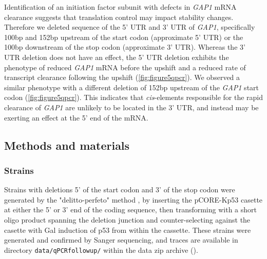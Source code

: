 Identification of an initiation factor subunit with defects in
\textit{GAP1} mRNA clearance suggests that translation control may
impact stability changes. Therefore we deleted sequence of 
the 5' UTR and 3' UTR of \textit{GAP1}, specifically 100bp and 152bp 
upstream of the start codon (approximate 5' UTR) or the
100bp downstream of the stop codon (approximate 3' UTR).
Whereas the 3' UTR deletion does not have an effect, the 5' UTR deletion
exhibits the phenotype of reduced \textit{GAP1} mRNA before the upshift
and a reduced rate of transcript clearance following the upshift
(\autoref{fig:figure5qpcr}). 
We observed a similar phenotype with a different deletion of 152bp upstream
of the \textit{GAP1} start codon (\autoref{fig:figure5qpcr}). 
This indicates that \textit{cis}-elements responsible for the
rapid clearance of \textit{GAP1} are unlikely to be located in the
3' UTR, and instead may be exerting an effect at the 5' end of the
mRNA.

\subsection{Methods and materials}

\subsubsection{Strains}

Strains with deletions 5' of the start codon and 3' of the stop
codon were generated by the "delitto-perfeto" 
method \parencite{storici2006delitto}, 
by inserting the pCORE-Kp53 casette
at either the 5' or 3' end of the coding sequence, then transforming
with a short oligo product spanning the deletion junction and
counter-selecting against the casette with Gal induction of p53 
from within the cassette.
These strains were generated and confirmed by Sanger sequencing,
and traces are available in directory \texttt{data/qPCRfollowup/} 
within the data zip archive ().

